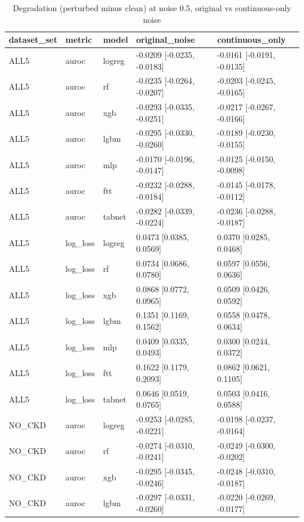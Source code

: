 \begin{table}[t]
\centering
\scriptsize
\caption{Degradation (perturbed minus clean) at noise 0.5, original vs continuous-only noise}
\begin{tabular}{lllll}
\toprule
dataset\_set & metric & model & original\_noise & continuous\_only \\
\midrule
ALL5 & auroc & logreg & -0.0209 [-0.0235, -0.0183] & -0.0161 [-0.0191, -0.0135] \\
ALL5 & auroc & rf & -0.0235 [-0.0264, -0.0207] & -0.0203 [-0.0245, -0.0165] \\
ALL5 & auroc & xgb & -0.0293 [-0.0335, -0.0251] & -0.0217 [-0.0267, -0.0166] \\
ALL5 & auroc & lgbm & -0.0295 [-0.0330, -0.0260] & -0.0189 [-0.0230, -0.0155] \\
ALL5 & auroc & mlp & -0.0170 [-0.0196, -0.0147] & -0.0125 [-0.0150, -0.0098] \\
ALL5 & auroc & ftt & -0.0232 [-0.0288, -0.0184] & -0.0145 [-0.0178, -0.0112] \\
ALL5 & auroc & tabnet & -0.0282 [-0.0339, -0.0224] & -0.0236 [-0.0288, -0.0187] \\
ALL5 & log\_loss & logreg & 0.0473 [0.0385, 0.0569] & 0.0370 [0.0285, 0.0468] \\
ALL5 & log\_loss & rf & 0.0734 [0.0686, 0.0780] & 0.0597 [0.0556, 0.0636] \\
ALL5 & log\_loss & xgb & 0.0868 [0.0772, 0.0965] & 0.0509 [0.0426, 0.0592] \\
ALL5 & log\_loss & lgbm & 0.1351 [0.1169, 0.1562] & 0.0558 [0.0478, 0.0634] \\
ALL5 & log\_loss & mlp & 0.0409 [0.0335, 0.0493] & 0.0300 [0.0244, 0.0372] \\
ALL5 & log\_loss & ftt & 0.1622 [0.1179, 0.2093] & 0.0862 [0.0621, 0.1105] \\
ALL5 & log\_loss & tabnet & 0.0646 [0.0519, 0.0765] & 0.0503 [0.0416, 0.0588] \\
NO\_CKD & auroc & logreg & -0.0253 [-0.0285, -0.0221] & -0.0198 [-0.0237, -0.0164] \\
NO\_CKD & auroc & rf & -0.0274 [-0.0310, -0.0241] & -0.0249 [-0.0300, -0.0202] \\
NO\_CKD & auroc & xgb & -0.0295 [-0.0345, -0.0246] & -0.0248 [-0.0310, -0.0187] \\
NO\_CKD & auroc & lgbm & -0.0297 [-0.0331, -0.0260] & -0.0220 [-0.0269, -0.0177] \\

\end{tabular}
\end{table}
